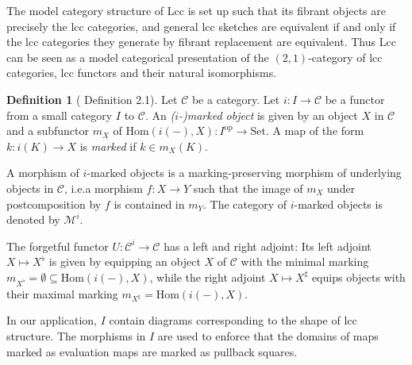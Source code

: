\documentclass{article}
\theoremstyle{remark}
\theoremstyle{definition}
\newtheorem{definition}{Definition}
\begin{document}
The model category structure of $\mathrm{Lcc}$ is set up such that its fibrant objects are precisely the lcc categories, and general lcc sketches are equivalent if and only if the lcc categories they generate by fibrant replacement are equivalent.
Thus $\mathrm{Lcc}$ can be seen as a model categorical presentation of the $(2, 1)$-category of lcc categories, lcc functors and their natural isomorphisms.

\begin{definition}[\cite{marked-objects} Definition 2.1]
  Let $\mathcal{C}$ be a category.
  Let $i : I \rightarrow \mathcal{C}$ be a functor from a small category $I$ to $\mathcal{C}$.
  An \emph{($i$-)marked object} is given by an object $X$ in $\mathcal{C}$ and a subfunctor $m_X$ of $\mathrm{Hom}(i(-), X) : I^\mathrm{op} \rightarrow \mathrm{Set}$.
  A map of the form $k : i(K) \rightarrow X$ is \emph{marked} if $k \in m_X(K)$.

  A morphism of $i$-marked objects is a marking-preserving morphism of underlying objects in $\mathcal{C}$, i.e.\@ a morphism $f : X \rightarrow Y$ such that the image of $m_X$ under postcomposition by $f$ is contained in $m_Y$.
  The category of $i$-marked objects is denoted by $\mathcal{M}^i$.
\end{definition}

The forgetful functor $U : \mathcal{C}^i \rightarrow \mathcal{C}$ has a left and right adjoint:
Its left adjoint $X \mapsto X^\flat$ is given by equipping an object $X$ of $\mathcal{C}$ with the minimal marking $m_{X^\flat} = \emptyset \subseteq \mathrm{Hom}(i(-), X)$, while the right adjoint $X \mapsto X^\sharp$ equips objects with their maximal marking $m_{X^\sharp} = \mathrm{Hom}(i(-), X)$.

In our application, $I$ contain diagrams corresponding to the shape of lcc structure.
The morphisms in $I$ are used to enforce that the domains of maps marked as evaluation maps are marked as pullback squares.
\end{document}
